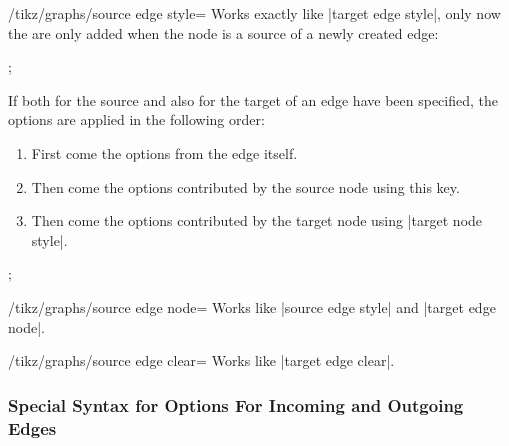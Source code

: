\begin{key}{/tikz/graphs/source edge style=}
    Works exactly like |target edge style|, only now the  are
    only added when the node is a source of a newly created edge:
\begin{codeexample}[]
\tikz {};
\end{codeexample}
    If both for the source and also for the target of an edge 
    have been specified, the options are applied in the following order:
    \begin{enumerate}
        \item First come the options from the edge itself.
        \item Then come the options contributed by the source node using this
            key.
        \item Then come the options contributed by the target node using
            |target node style|.
    \end{enumerate}
\begin{codeexample}[]
\tikz {};
\end{codeexample}
\end{key}

\begin{key}{/tikz/graphs/source edge node=}
    Works like |source edge style| and |target edge node|.
\end{key}

\begin{key}{/tikz/graphs/source edge clear=}
    Works like |target edge clear|.
\end{key}


\subsubsection{Special Syntax for Options For Incoming and Outgoing Edges}
\label{section-syntax-outgoing-incoming}

